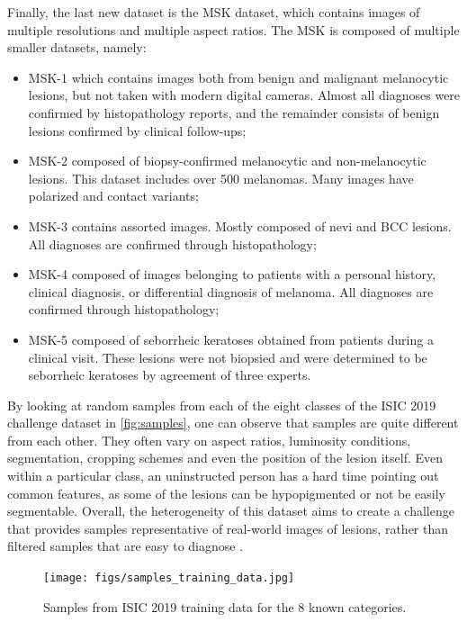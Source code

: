     Finally, the last new dataset is the MSK dataset, which contains images of multiple resolutions and multiple aspect ratios. The MSK is composed of multiple smaller datasets, namely:
    \begin{itemize}
        \item MSK-1 which contains images both from benign and malignant melanocytic lesions, but not taken with modern digital cameras. Almost all diagnoses were confirmed by histopathology reports, and the remainder consists of benign lesions confirmed by clinical follow-ups;
        \item MSK-2 composed of biopsy-confirmed melanocytic and non-melanocytic lesions. This dataset includes over 500 melanomas. Many images have polarized and contact variants;
        \item MSK-3 contains assorted images. Mostly composed of nevi and \ac{BCC} lesions. All diagnoses are confirmed through histopathology;
        \item MSK-4 composed of images belonging to patients with a personal history, clinical diagnosis, or differential diagnosis of melanoma. All diagnoses are confirmed through histopathology;
        \item MSK-5 composed of seborrheic keratoses obtained from patients during a clinical visit. These lesions were not biopsied and were determined to be seborrheic keratoses by agreement of three experts.
    \end{itemize}
    
    By looking at random samples from each of the eight classes of the \ac{ISIC} 2019 challenge dataset in \autoref{fig:samples}, one can observe that samples are quite different from each other. They often vary on aspect ratios, luminosity conditions, segmentation, cropping schemes and even the position of the lesion itself. Even within a particular class, an uninstructed person has a hard time pointing out common features, as some of the lesions can be hypopigmented or not be easily segmentable. Overall, the heterogeneity of this dataset aims to create a challenge that provides samples representative of real-world images of lesions, rather than filtered samples that are easy to diagnose \cite{bcn_20000}. \par
    
    \begin{figure}
      \texttt{[image: figs/samples\_training\_data.jpg]}
      \caption{Samples from ISIC 2019 training data for the 8 known categories.}
      \label{fig:samples}
    \end{figure}
    
